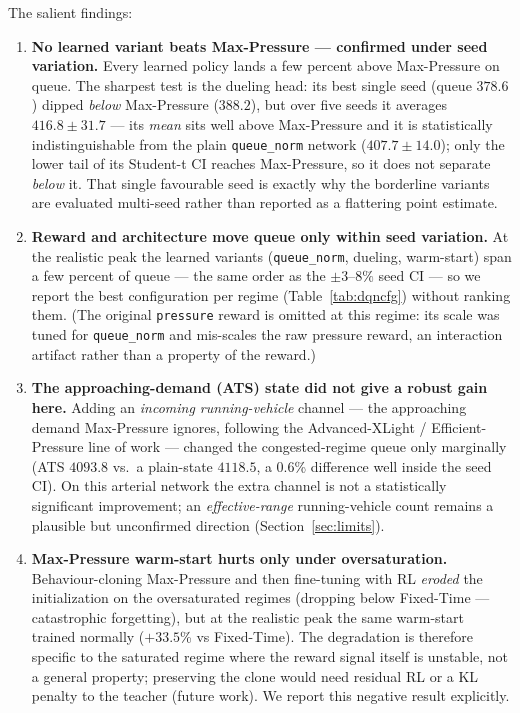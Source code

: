 The salient findings:
\begin{enumerate}
  \item \textbf{No learned variant beats Max-Pressure --- confirmed under seed variation.}
        Every learned policy lands a few percent above Max-Pressure on queue. The sharpest
        test is the dueling head: its best single seed (queue $378.6$) dipped \emph{below}
        Max-Pressure ($388.2$), but over five seeds it averages $416.8\pm31.7$ --- its \emph{mean}
        sits well above Max-Pressure and it is statistically indistinguishable from the plain
        \texttt{queue\_norm} network ($407.7\pm14.0$); only the lower tail of its Student-t CI
        reaches Max-Pressure, so it does not separate \emph{below} it. That single favourable seed
        is exactly why the borderline variants are evaluated multi-seed rather than reported as a
        flattering point estimate.
  \item \textbf{Reward and architecture move queue only within seed variation.} At the
        realistic peak the learned variants (\texttt{queue\_norm}, dueling, warm-start) span a
        few percent of queue --- the same order as the $\pm3$--$8\%$ seed CI --- so we report the
        best configuration per regime (Table~\ref{tab:dqncfg}) without ranking them. (The
        original \texttt{pressure} reward is omitted at this regime: its scale was tuned for
        \texttt{queue\_norm} and mis-scales the raw pressure reward, an interaction artifact
        rather than a property of the reward.)
  \item \textbf{The approaching-demand (ATS) state did not give a robust gain here.} Adding an
        \emph{incoming running-vehicle} channel --- the approaching demand Max-Pressure ignores,
        following the Advanced-XLight / Efficient-Pressure line of work
        \cite{Advanced_XLight_2022} --- changed the congested-regime queue only marginally
        (ATS $4093.8$ vs.\ a plain-state $4118.5$, a $0.6$\% difference well inside the seed CI).
        On this arterial network the extra channel is not a statistically significant improvement;
        an \emph{effective-range} running-vehicle count remains a plausible but unconfirmed
        direction (Section~\ref{sec:limits}).
  \item \textbf{Max-Pressure warm-start hurts only under oversaturation.} Behaviour-cloning
        Max-Pressure and then fine-tuning with RL \emph{eroded} the initialization on the
        oversaturated regimes (dropping below Fixed-Time --- catastrophic forgetting), but at the
        realistic peak the same warm-start trained normally ($+33.5$\% vs Fixed-Time). The
        degradation is therefore specific to the saturated regime where the reward signal itself
        is unstable, not a general property; preserving the clone would need residual RL or a KL
        penalty to the teacher (future work). We report this negative result explicitly.
\end{enumerate}

